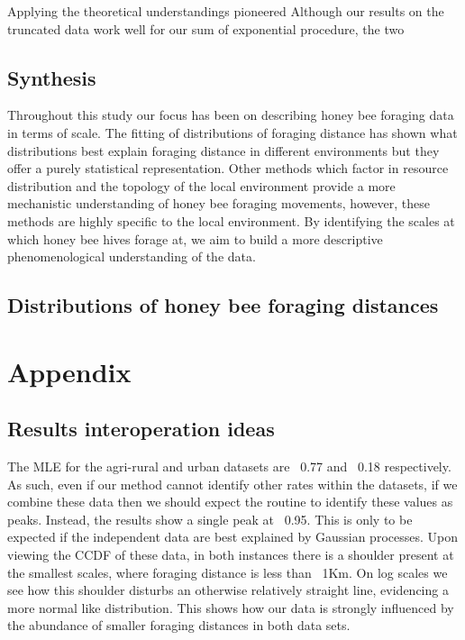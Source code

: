 \documentclass[11pt,usenames,dvipsnames]{article}
\begin{document}
Applying the theoretical understandings pioneered  
Although our results on the truncated data work well for our sum of exponential procedure, the two



\subsection{Synthesis}

Throughout this study our focus has been on describing honey bee foraging data in terms of scale. The fitting of distributions of foraging distance has shown what distributions best explain foraging distance in different environments but they offer a purely statistical representation. Other methods which factor in resource distribution and the topology of the local environment provide a more mechanistic understanding of honey bee foraging movements, however, these methods are highly specific to the local environment. By identifying the scales at which honey bee hives forage at, we aim to build a more descriptive phenomenological understanding of the data. 

\subsection{Distributions of honey bee foraging distances} 


\section{Appendix}

\subsection{Results interoperation ideas}

The MLE for the agri-rural and urban datasets are ~0.77 and ~0.18 respectively. As such, even if our method cannot identify other rates within the datasets, if we combine these data then we should expect the routine to identify these values as peaks. Instead, the results show a single peak at ~0.95. This is only to be expected if the independent data are best explained by Gaussian processes. Upon viewing the CCDF of these data, in both instances there is a shoulder present at the smallest scales, where foraging distance is less than ~1Km. On log scales we see how this shoulder disturbs an otherwise relatively straight line, evidencing a more normal like distribution. This shows how our data is strongly influenced by the abundance of smaller foraging distances in both data sets.
\end{document}
